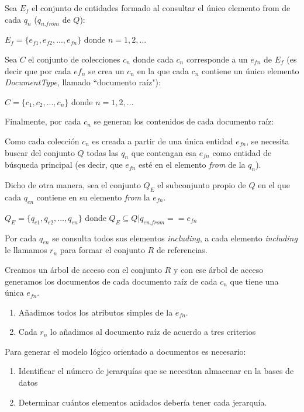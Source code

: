 Sea $E_{f}$ el conjunto de entidades formado al consultar el único elemento from de cada $q_n$ ($q_{n.from}$ de $Q$): 

\begin{center}
    $ E_{f} = \{e_{f1},e_{f2},...,e_{fn}\} $ donde $n=1,2,...$    
\end{center}


Sea $C$ el conjunto de colecciones $c_{n}$ donde cada $c_{n}$ corresponde a un $e_{fn}$ de $E_{f}$ (es decir que por cada $ef_{n}$ se crea un $c_{n}$ en la que cada $c_{n}$ contiene un único elemento \textit{DocumentType}, llamado ``documento raíz"):

\begin{center}
    $C = \{ c_{1},c_{2},...,c_{n}\}$ donde $n=1,2,...$    
\end{center}

Finalmente, por cada $c_{n}$ se generan los contenidos de cada documento raíz:

Como cada colección $c_{n}$ es creada a partir de una única entidad $e_{fn}$, se necesita buscar del conjunto $Q$ todas las $q_{n}$ que contengan esa $e_{fn}$ como entidad de búsqueda principal (es decir, que $e_{fn}$ esté en el elemento \textit{from} de la $q_{n}$).


Dicho de otra manera, sea el conjunto $Q_{E}$ el subconjunto propio de $Q$ en el que cada $q_{en}$ contiene en su elemento \textit{from} la $e_{fn}$.
\begin{center}
    $Q_{E} = \{q_{e1},q_{e2},...,q_{en}\}$ donde $Q_{E} \subseteq Q  | q_{en.from} == e_{fn}$
\end{center}

Por cada $q_{en}$ se consulta todos sus elementos \textit{including}, a cada elemento \textit{including} le llamamos $r_{n}$ para formar el conjunto $R$ de referencias.

Creamos un árbol de acceso con el conjunto $R$ y con ese árbol de acceso generamos los documentos de cada documento raíz de cada $c_{n}$ que tiene una única $e_{fn}$.

\begin{enumerate}
    \item Añadimos todos los atributos simples de la $e_{fn}$.
    \item Cada $r_{n}$ lo añadimos al documento raíz de acuerdo a tres criterios
\end{enumerate}

Para generar el modelo lógico orientado a documentos es necesario:
\begin{enumerate}
    \item Identificar el número de jerarquías que se necesitan almacenar en la bases de datos
    \item Determinar cuántos elementos anidados debería tener cada jerarquía.
\end{enumerate}

